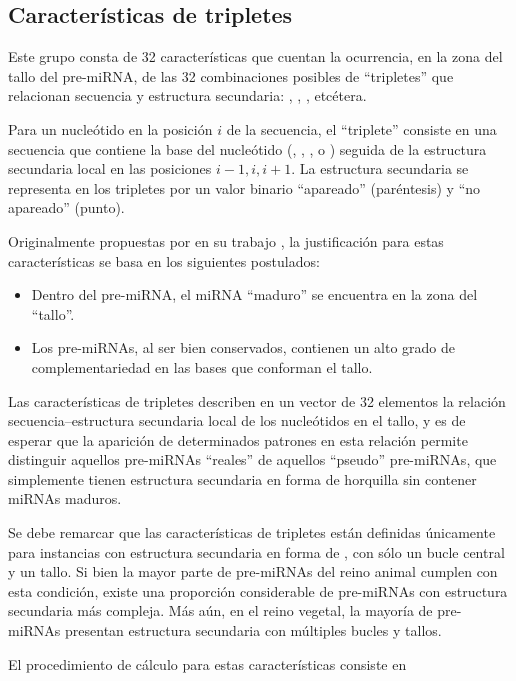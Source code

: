 
\subsection{Características de tripletes}
Este grupo consta de 32 características que cuentan la ocurrencia, en
la zona del tallo del pre-miRNA, de las 32 combinaciones posibles de
``tripletes'' que relacionan secuencia y estructura secundaria:
, , , etcétera.

Para un nucleótido en la posición $i$ de la secuencia, el ``triplete''
consiste en una secuencia que contiene la base del nucleótido (\ntA,
\ntC, \ntG, o \ntU) seguida de la estructura secundaria local en las
posiciones $i-1,i,i+1$. La estructura secundaria se representa en los
tripletes por un valor binario ``apareado'' \pairL (paréntesis) y ``no
apareado'' \noPair (punto).

Originalmente propuestas por \citeauthor{xue} en su trabajo
\cite{xue}, la justificación para estas características se basa en los
siguientes postulados:

\begin{itemize}
\item Dentro del pre-miRNA, el miRNA ``maduro'' se encuentra en la
  zona del ``tallo''.
\item Los pre-miRNAs, al ser bien conservados, contienen un alto grado
  de complementariedad en las bases que conforman el tallo.
\end{itemize}
Las características de tripletes describen en un vector de 32
elementos la relación secuencia--estructura secundaria local de los
nucleótidos en el tallo, y es de esperar que la aparición de
determinados patrones en esta relación permite distinguir aquellos
pre-miRNAs ``reales'' de aquellos ``pseudo'' pre-miRNAs, que
simplemente tienen estructura secundaria en forma de horquilla sin
contener miRNAs maduros.

Se debe remarcar que las características de tripletes están definidas
únicamente para instancias con estructura secundaria en forma de
, con sólo un bucle central y un tallo.  Si bien la mayor
parte de pre-miRNAs del reino animal cumplen con esta condición,
existe una proporción considerable de pre-miRNAs con estructura
secundaria más compleja. Más aún, en el reino vegetal, la mayoría de
pre-miRNAs presentan estructura secundaria con múltiples bucles y
tallos.

El procedimiento de cálculo para estas características consiste en

